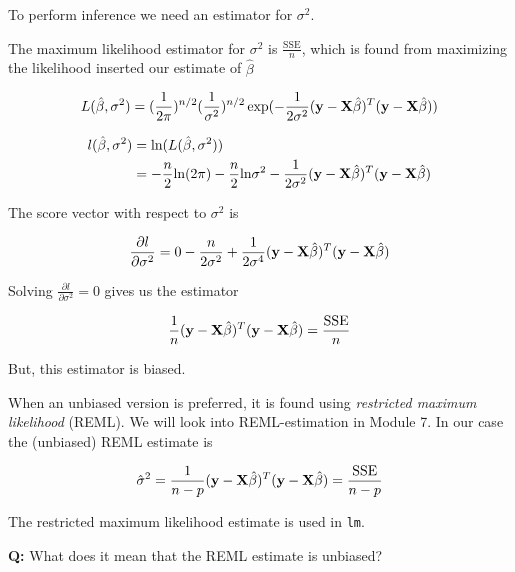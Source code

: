 \documentclass[
  ignorenonframetext,
]{beamer}
\begin{document}
\begin{frame}
To perform inference we need an estimator for \(\sigma^2\).

The maximum likelihood estimator for \(\sigma^2\) is
\(\frac{\text{SSE}}{n}\), which is found from maximizing the likelihood
inserted our estimate of \(\hat{\beta}\)

\[
L(\hat{\beta},{\sigma^2})=(\frac{1}{2\pi})^{n/2}(\frac{1}{\sigma^2})^{n/2}\exp(-\frac{1}{2\sigma^2} ({\bf y}-{\bf X}\hat{\beta})^T({\bf y}-{\bf X}\hat{\beta}))
\]

\[
\begin{aligned}
l(\hat{\beta},{\sigma^2}) &= \text{ln}(L(\hat{\beta},{\sigma^2})) \\ 
&= -\frac{n}{2}\text{ln}(2\pi)-\frac{n}{2}\text{ln}\sigma^2-\frac{1}{2\sigma^2} ({\bf y}-{\bf X}\hat{\beta})^T({\bf y}-{\bf X}\hat{\beta})
\end{aligned}
\]

The score vector with respect to \(\sigma^2\) is

\[
\frac{\partial l}{\partial \sigma^2}=0-\frac{n}{2\sigma^2}+\frac{1}{2\sigma^4}({\bf y}-{\bf X}\hat{\beta})^T({\bf y}-{\bf X}\hat{\beta})
\]

Solving \(\frac{\partial l}{\partial \sigma^2}=0\) gives us the
estimator

\[
\frac{1}{n}({\bf y}-{\bf X}\hat{\beta})^T({\bf y}-{\bf X}\hat{\beta})=\frac{\text{SSE}}{n}
\]

But, this estimator is biased.
\end{frame}

\begin{frame}[fragile]
When an unbiased version is preferred, it is found using
\emph{restricted maximum likelihood} (REML). We will look into
REML-estimation in Module 7. In our case the (unbiased) REML estimate is

\[ \hat{\sigma}^2=\frac{1}{n-p}({\bf y}-{\bf X}\hat{\beta})^T({\bf y}-{\bf X}\hat{\beta})=\frac{\text{SSE}}{n-p}\]

The restricted maximum likelihood estimate is used in \texttt{lm}.

\textbf{Q:} {What does it mean that the REML estimate is unbiased?}
\end{frame}
\end{document}
